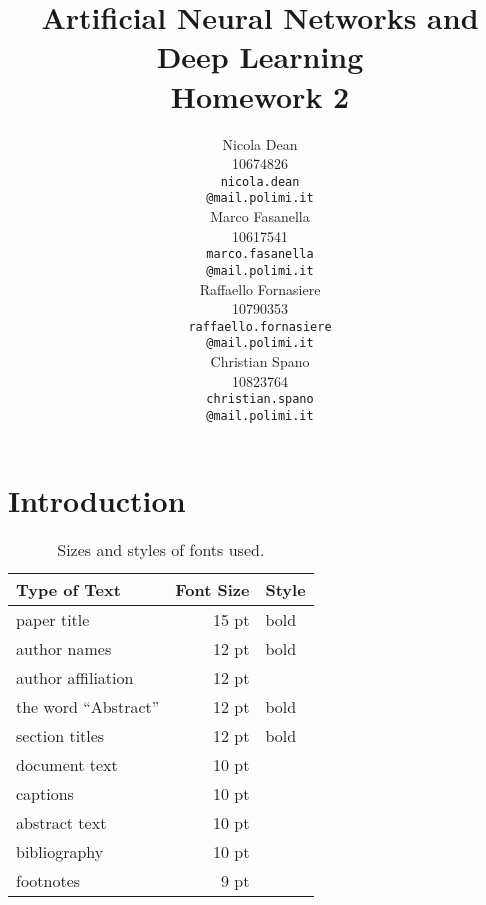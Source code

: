 \documentclass[11pt]{article}
\title{Artificial Neural Networks and Deep Learning \\
Homework 2}
\author{
  Nicola Dean \\
  10674826 \\
  {\tt nicola.dean \\
  \tt @mail.polimi.it} \\\And
  Marco Fasanella \\
  10617541 \\
  {\tt marco.fasanella \\
  \tt @mail.polimi.it} \\\And
  Raffaello Fornasiere \\
    10790353 \\
    {\tt raffaello.fornasiere \\
    \tt @mail.polimi.it} \\\And
  Christian Spano \\
  10823764 \\
  {\tt christian.spano \\
  \tt @mail.polimi.it} \\}
\date{}
\begin{document}
\maketitle


\section{Introduction}


\begin{table}[h]
\begin{center}
\begin{tabular}{|l|rl|}
\hline \bf Type of Text & \bf Font Size & \bf Style \\ \hline
paper title & 15 pt & bold \\
author names & 12 pt & bold \\
author affiliation & 12 pt & \\
the word ``Abstract'' & 12 pt & bold \\
section titles & 12 pt & bold \\
document text & 10 pt  &\\
captions & 10 pt & \\
abstract text & 10 pt & \\
bibliography & 10 pt & \\
footnotes & 9 pt & \\
\hline
\end{tabular}
\end{center}
\caption{\label{fontsizes} Sizes and styles of fonts used.}
\end{table}


\end{document}
